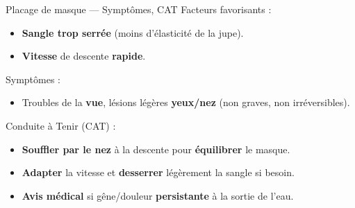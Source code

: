 \begin{frame}{Placage de masque — Symptômes, CAT}
    \vspace{0.3em}
    Facteurs favorisants :
    \begin{itemize}
        \item \textbf{\textcolor{ffessmred}{Sangle trop serrée}} (moins d'élasticité de la jupe).
        \item \textbf{\textcolor{ffessmred}{Vitesse}} de descente \textbf{rapide}.
    \end{itemize}

    \vspace{0.3em}
    Symptômes :
    \begin{itemize}
        \item Troubles de la \textbf{\textcolor{ffessmred}{vue}}, lésions légères \textbf{yeux/nez} (non graves, non irréversibles).
    \end{itemize}

    \vspace{0.3em}
    Conduite à Tenir (CAT) :
    \begin{itemize}
        \item \textbf{\textcolor{ffessmred}{Souffler par le nez}} à la descente pour \textbf{\textcolor{ffessmred}{équilibrer}} le masque.
        \item \textbf{\textcolor{ffessmred}{Adapter}} la vitesse et \textbf{\textcolor{ffessmred}{desserrer}} légèrement la sangle si besoin.
        \item \textbf{\textcolor{ffessmred}{Avis médical}} si gêne/douleur \textbf{\textcolor{ffessmred}{persistante}} à la sortie de l'eau.
    \end{itemize}
\end{frame}


